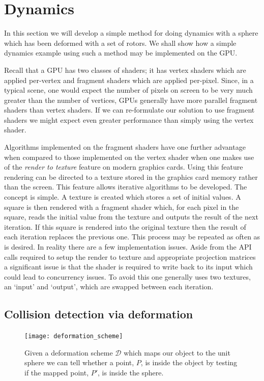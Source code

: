 \section{Dynamics}

In this section we will develop a simple method for doing dynamics with a sphere
which has been deformed with a set of rotors. We shall show how a simple dynamics example
using such a method may be implemented on the GPU.

Recall that a GPU has two classes of shaders; it has vertex shaders which are applied
per-vertex and fragment shaders which are applied per-pixel. Since, in a typical scene,
one would expect the number of pixels on screen to be very much greater than the number
of vertices, GPUs generally have more parallel fragment shaders than vertex shaders.
If we can re-formulate our solution to use fragment shaders we might expect even
greater performance than simply using the vertex shader.

Algorithms implemented on the fragment shaders have one further 
advantage when compared to those implemented on the vertex shader when one makes use
of the \emph{render to texture} feature on modern graphics cards. Using this feature
rendering can be directed to a texture stored in the graphics card memory rather than the
screen. This feature allows iterative algorithms to be developed.
The concept is simple. A texture is created which stores a set of initial values. 
A square is then rendered with a fragment shader which, for each pixel in the square,
reads the initial value from the texture and outputs the result of the next iteration.
If this square is rendered into the original texture then the result of each iteration
replaces the previous one. This process may be repeated as often as is desired.
In reality there are a few implementation issues. Aside from the API calls required to
setup the render to texture and appropriate projection matrices a significant issue is
that the shader is required to write back to its input which could lead to
concurrency issues. To avoid this one generally uses two textures, an `input' and `output',
which are swapped between each iteration.

\subsection{Collision detection via deformation}

\begin{figure}
\centering
\texttt{[image: deformation\_scheme]}
\caption{\label{fig:deformation_scheme}Given a deformation scheme $\mathcal{D}$ which maps
  our object to the unit sphere we can tell whether a point, $P$, is inside the object by
          testing if the mapped point, $P'$, is inside the sphere.}
\end{figure}

